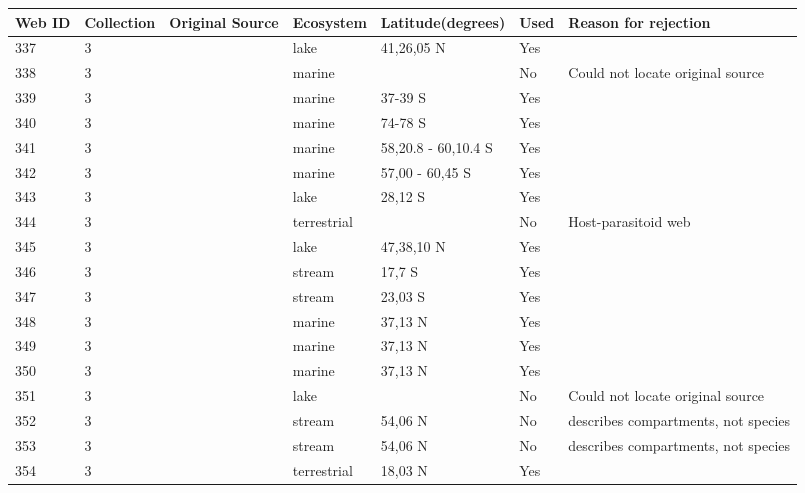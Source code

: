 \documentclass[12pt]{article}
\begin{document}
\begin{landscape}
    \begin{table}[h!]
    \centering
    {\footnotesize
      \begin{tabular}{p{2.8cm}p{1.3cm}p{3cm}p{2.2cm}p{2.5cm}lp{8.2cm}}
        \hline
        Web ID & Collection & Original Source & Ecosystem & Latitude(degrees) & Used  & Reason for rejection  \\
        \hline
        337   & 3 & \cite{Alcorlo2001}  & lake  & 41,26,05 N & Yes   &       \\
        338   & 3 & \cite{Torres2013}  & marine &       & No    & Could not locate original source \\
        339   & 3 & \cite{Bulman2001}  & marine & 37-39 S & Yes  &     \\
        340   & 3 & \cite{Smith2007}  & marine & 74-78 S & Yes   &       \\
        341   & 3 & \cite{Lancraft1991}  & marine & 58,20.8 - 60,10.4 S & Yes   &       \\
        342   & 3 & \cite{Hopkins1993}  & marine & 57,00 - 60,45 S & Yes  &     \\
        343   & 3 & \cite{Kitching1987}  & lake  & 28,12 S & Yes   &       \\
        344   & 3 & \cite{Hodkinson2004}  & terrestrial &       & No    & Host-parasitoid web \\
        345   & 3 & \cite{Boit2012}  & lake  & 47,38,10 N & Yes  &     \\
        346   & 3 & \cite{Rayner2010}  & stream & 17,7 S & Yes   &       \\
        347   & 3 & \cite{Motta2005}  & stream & 23,03 S & Yes   &       \\
        348   & 3 & \cite{Douglass2011}    & marine & 37,13 N & Yes   &       \\
        349   & 3 & \cite{Douglass2011}    & marine & 37,13 N & Yes   &       \\
        350   & 3 & \cite{Douglass2011}    & marine & 37,13 N & Yes  &     \\
        351   & 3 & \cite{Warren1989}     & lake  &       & No    & Could not locate original source \\
        352   & 3 & \cite{Poepperl2003}  & stream & 54,06 N & No    & describes compartments, not species \\
        353   & 3 & \cite{Poepperl2003}  & stream & 54,06 N & No    & describes compartments, not species \\
        354   & 3 & \cite{Goldwasser1993}  & terrestrial & 18,03 N & Yes   &       \\

\end{tabular}}
\end{table}
\end{landscape}
\end{document}
